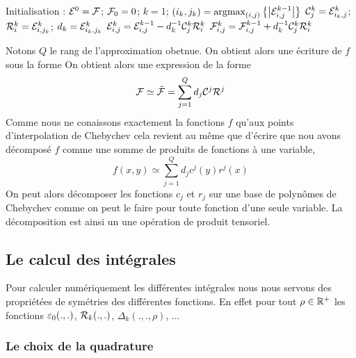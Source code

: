 \documentclass[10pt]{article}
\begin{document}
\begin{multicols}{2}
\begin{algorithm}[H]
  \begin{algorithmic}[1]
    \STATE Initialisation : $\mathcal{E} ^0 = \mathcal{F} $; $\mathcal{F} _0 = 0$; $k = 1$;
    \STATE $(i_k, j_k) =  {\text{argmax}}_{(i,j)} \left\{\left| \mathcal{E} ^{k-1}_{i,j} \right| \right\}$
    \STATE $\mathcal{C} ^k_{j} = \mathcal{E} ^k_{i_k,j}$;  $\mathcal{R} ^k_{i} = \mathcal{E} ^k_{i,j_k}$; $d_k = \mathcal{E} ^k_{i_k,j_k}$
    \STATE $\mathcal{E} ^k_{i,j} = \mathcal{E} ^{k-1}_{i,j} - d_k^{-1}\mathcal{C} ^k_{j}\mathcal{R} ^k_{i}$
    \STATE $\mathcal{F} ^k_{i,j} = \mathcal{F} ^{k-1}_{i,j} + d_k^{-1}\mathcal{C} ^k_{j}\mathcal{R} ^k_{i}$
    \ENDWHILE
  \end{algorithmic}
\end{algorithm}

Notons $Q$ le rang de l'approximation obetnue. On obtient alors une écriture de $f$ sous la forme 
On obtient alors une expression de la forme 
\begin{equation}
\mathcal{F}  \simeq \tilde{\mathcal{F} } = \sum_{j=1}^Q d_j \mathcal{C} ^j \mathcal{R} ^j
\end{equation}
Comme nous ne conaissons exactement la fonctions $f$ qu'aux points d'interpolation de Chebychev cela revient au même que d'écrire que nou avons décomposé $f$ comme une somme de produits de fonctions à une variable,
\begin{equation}
f(x,y) \simeq \sum_{j=1}^Q d_jc^j(y)r^j(x)
\end{equation}
On peut alors décomposer les fonctions $c_j$ et $r_j$ sur une base de polynômes de Chebychev comme on peut le faire pour toute fonction d'une seule variable. La décomposition est ainsi un une opération de produit tensoriel. \\







\subsection{Le calcul des intégrales} 

Pour calculer numériquement les différentes intégrales nous nous servons des propriétées de symétries des différentes fonctions. En effet pour tout $\rho \in \mathbb{R}^+$ les fonctions $\varepsilon_0(.,.)$, $\mathcal{R}_k(.,.)$, $\Delta_k(.,.,\rho)$, ...


\subsubsection{Le choix de la quadrature}


\end{multicols}
\end{document}
